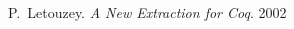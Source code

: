 \begin{thebibliography}{99}

   P.~Letouzey.
   \emph{A New Extraction for Coq}.
   2002

\end{thebibliography}
